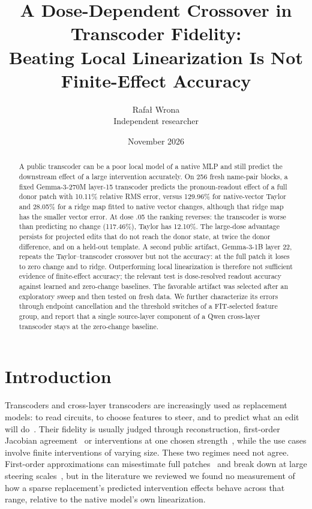 \documentclass[11pt]{article}
\title{A Dose-Dependent Crossover in Transcoder Fidelity:\\Beating Local Linearization Is Not Finite-Effect Accuracy}
\author{Rafa\l{} Wrona\\ \small Independent researcher}
\date{November 2026}
\begin{document}
\maketitle
\begin{abstract}
A public transcoder can be a poor local model of a native MLP and still predict the downstream effect of a large intervention accurately. On 256 fresh name-pair blocks, a fixed Gemma-3-270M layer-15 transcoder predicts the pronoun-readout effect of a full donor patch with 10.11\% relative RMS error, versus 129.96\% for native-vector Taylor and 28.05\% for a ridge map fitted to native vector changes, although that ridge map has the smaller vector error. At dose .05 the ranking reverses: the transcoder is worse than predicting no change (117.46\%), Taylor has 12.10\%. The large-dose advantage persists for projected edits that do not reach the donor state, at twice the donor difference, and on a held-out template. A second public artifact, Gemma-3-1B layer 22, repeats the Taylor--transcoder crossover but not the accuracy: at the full patch it loses to zero change and to ridge. Outperforming local linearization is therefore not sufficient evidence of finite-effect accuracy; the relevant test is dose-resolved readout accuracy against learned and zero-change baselines. The favorable artifact was selected after an exploratory sweep and then tested on fresh data. We further characterize its errors through endpoint cancellation and the threshold switches of a FIT-selected feature group, and report that a single source-layer component of a Qwen cross-layer transcoder stays at the zero-change baseline.
\end{abstract}

\section{Introduction}
Transcoders and cross-layer transcoders are increasingly used as replacement models: to read circuits, to choose features to steer, and to predict what an edit will do~\cite{dunefsky2024,ameisen2025}. Their fidelity is usually judged through reconstruction, first-order Jacobian agreement~\cite{shabalin2026} or interventions at one chosen strength~\cite{ameisen2025}, while the use cases involve finite interventions of varying size. These two regimes need not agree. First-order approximations can misestimate full patches~\cite{syed2023} and break down at large steering scales~\cite{guo2026}, but in the literature we reviewed we found no measurement of how a sparse replacement's predicted intervention effects behave across that range, relative to the native model's own linearization.
\end{document}
